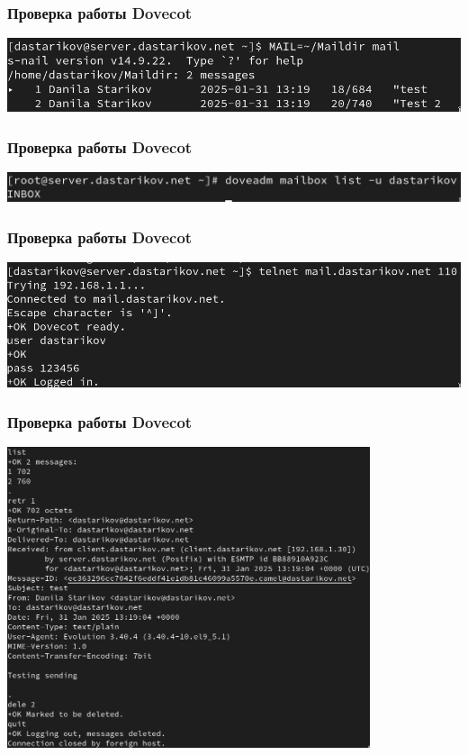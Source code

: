 \begin{frame}
\frametitle{Проверка работы Dovecot}
    \centering
    \includegraphics[width=\textwidth]{../images/image17.png}
\end{frame}

\begin{frame}
\frametitle{Проверка работы Dovecot}
    \centering
    \includegraphics[width=\textwidth]{../images/image18.png}
\end{frame}

\begin{frame}
\frametitle{Проверка работы Dovecot}
    \centering
    \includegraphics[width=\textwidth]{../images/image19.png}
\end{frame}

\begin{frame}
\frametitle{Проверка работы Dovecot}
    \centering
    \includegraphics[width=0.8\textwidth]{../images/image20.png}
\end{frame}

